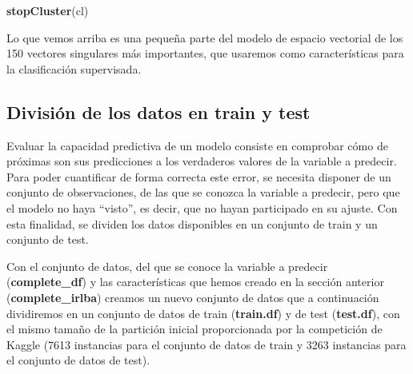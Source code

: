 \documentclass[
]{article}
\newenvironment{Shaded}{\begin{snugshade}}{\end{snugshade}}
\newcommand{\DataTypeTok}[1]{\textcolor[rgb]{0.13,0.29,0.53}{#1}}
\newcommand{\DecValTok}[1]{\textcolor[rgb]{0.00,0.00,0.81}{#1}}
\newcommand{\KeywordTok}[1]{\textcolor[rgb]{0.13,0.29,0.53}{\textbf{#1}}}
\newcommand{\NormalTok}[1]{#1}
\newcommand{\OperatorTok}[1]{\textcolor[rgb]{0.81,0.36,0.00}{\textbf{#1}}}
\newcommand{\StringTok}[1]{\textcolor[rgb]{0.31,0.60,0.02}{#1}}
\begin{document}
\begin{Shaded}
\begin{Highlighting}[]
\KeywordTok{stopCluster}\NormalTok{(cl)}
\end{Highlighting}
\end{Shaded}

Lo que vemos arriba es una pequeña parte del modelo de espacio vectorial
de los 150 vectores singulares más importantes, que usaremos como
características para la clasificación supervisada.

\hypertarget{divisiuxf3n-de-los-datos-en-train-y-test}{%
\subsection{División de los datos en train y
test}\label{divisiuxf3n-de-los-datos-en-train-y-test}}

Evaluar la capacidad predictiva de un modelo consiste en comprobar cómo
de próximas son sus predicciones a los verdaderos valores de la variable
a predecir. Para poder cuantificar de forma correcta este error, se
necesita disponer de un conjunto de observaciones, de las que se conozca
la variable a predecir, pero que el modelo no haya ``visto'', es decir,
que no hayan participado en su ajuste. Con esta finalidad, se dividen
los datos disponibles en un conjunto de train y un conjunto de test.

Con el conjunto de datos, del que se conoce la variable a predecir
(\textbf{complete\_df}) y las características que hemos creado en la
sección anterior (\textbf{complete\_irlba}) creamos un nuevo conjunto de
datos que a continuación dividiremos en un conjunto de datos de train
(\textbf{train.df}) y de test (\textbf{test.df}), con el mismo tamaño de
la partición inicial proporcionada por la competición de Kaggle (7613
instancias para el conjunto de datos de train y 3263 instancias para el
conjunto de datos de test).

\begin{Shaded}
\end{Shaded}
\end{document}
